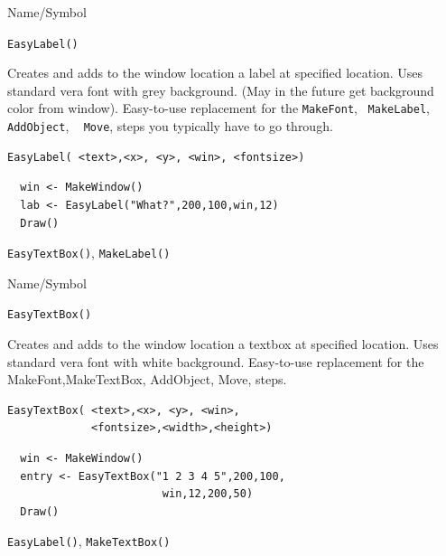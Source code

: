 \begin{desc}{Name/Symbol}
\item[Name/Symbol]	\verb+EasyLabel()+

\item[Description] Creates and adds to the window location a label
  at specified location. Uses standard vera font with grey background.
   (May in the future get background color from window).
  Easy-to-use replacement for the \verb+MakeFont+,  ~\verb+MakeLabel+,
 ~ \verb+AddObject+, ~ \verb+Move+, steps you typically have to go through.

\item[Usage]
\begin{verbatim}
EasyLabel( <text>,<x>, <y>, <win>, <fontsize>)
\end{verbatim}

\item[Example]	
\begin{verbatim}
  win <- MakeWindow()
  lab <- EasyLabel("What?",200,100,win,12)
  Draw()
\end{verbatim}
\item[See Also]	
\verb+EasyTextBox()+, \verb+MakeLabel()+
\end{desc}




\begin{desc}{Name/Symbol}
\item[Name/Symbol]	\verb+EasyTextBox()+

\item[Description] Creates and adds to the window location a textbox
  at specified location. Uses standard vera font with white background.
  Easy-to-use replacement for the MakeFont,MakeTextBox,
  AddObject, Move, steps.

\item[Usage]
\begin{verbatim}
EasyTextBox( <text>,<x>, <y>, <win>,
             <fontsize>,<width>,<height>)
\end{verbatim}

\item[Example]	
\begin{verbatim}
  win <- MakeWindow()
  entry <- EasyTextBox("1 2 3 4 5",200,100,
                        win,12,200,50)
  Draw()
\end{verbatim}
\item[See Also]	
\verb+EasyLabel()+, \verb+MakeTextBox()+
\end{desc}



